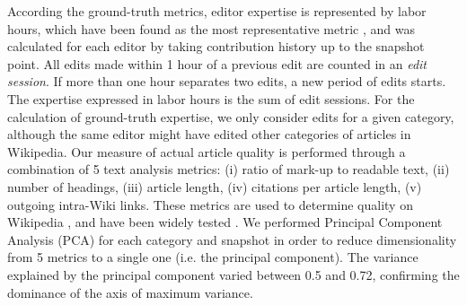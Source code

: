 According the ground-truth metrics, editor expertise is represented by labor hours, which have been  found as the most representative metric \cite{geiger2013}, and was calculated for each editor by taking contribution history up to the snapshot point. All edits made within 1 hour of a previous edit are counted in an {\it edit session}. If more than one hour separates two edits, a new period of edits  starts. The expertise expressed in labor hours is the sum of edit sessions. For the calculation of ground-truth expertise, we only consider edits for a given category, although the same editor might have edited other categories of articles in Wikipedia. Our measure of actual article quality is performed through a combination of 5 text analysis metrics: (i) ratio of mark-up to readable text, (ii) number of headings, (iii) article length, (iv) citations per article length, (v) outgoing intra-Wiki links. These metrics are used to determine quality on Wikipedia \cite{wang2013tell}, and have been widely tested \cite{klein}. We performed Principal Component Analysis (PCA) for each category and snapshot in order to reduce dimensionality from 5 metrics to a single one (i.e. the principal component). The variance explained by the principal component varied between 0.5 and 0.72, confirming the dominance of the axis of maximum variance.

